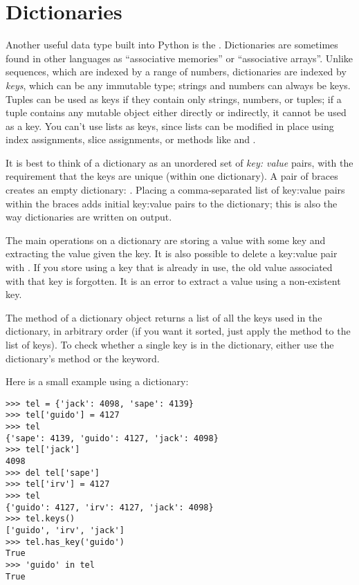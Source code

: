 \documentclass{manual}
\begin{document}
\section{Dictionaries \label{dictionaries}}

Another useful data type built into Python is the
.
Dictionaries are sometimes found in other languages as ``associative
memories'' or ``associative arrays''.  Unlike sequences, which are
indexed by a range of numbers, dictionaries are indexed by \emph{keys},
which can be any immutable type; strings and numbers can always be
keys.  Tuples can be used as keys if they contain only strings,
numbers, or tuples; if a tuple contains any mutable object either
directly or indirectly, it cannot be used as a key.  You can't use
lists as keys, since lists can be modified in place using
index assignments, slice assignments, or methods like
 and .

It is best to think of a dictionary as an unordered set of
\emph{key: value} pairs, with the requirement that the keys are unique
(within one dictionary).
A pair of braces creates an empty dictionary: \code{\{\}}.
Placing a comma-separated list of key:value pairs within the
braces adds initial key:value pairs to the dictionary; this is also the
way dictionaries are written on output.

The main operations on a dictionary are storing a value with some key
and extracting the value given the key.  It is also possible to delete
a key:value pair
with .
If you store using a key that is already in use, the old value
associated with that key is forgotten.  It is an error to extract a
value using a non-existent key.

The  method of a dictionary object returns a list of all
the keys used in the dictionary, in arbitrary order (if you want it
sorted, just apply the  method to the list of keys).  To
check whether a single key is in the dictionary, either use the dictionary's
 method or the  keyword.

Here is a small example using a dictionary:

\begin{verbatim}
>>> tel = {'jack': 4098, 'sape': 4139}
>>> tel['guido'] = 4127
>>> tel
{'sape': 4139, 'guido': 4127, 'jack': 4098}
>>> tel['jack']
4098
>>> del tel['sape']
>>> tel['irv'] = 4127
>>> tel
{'guido': 4127, 'irv': 4127, 'jack': 4098}
>>> tel.keys()
['guido', 'irv', 'jack']
>>> tel.has_key('guido')
True
>>> 'guido' in tel
True
\end{verbatim}
\end{document}
